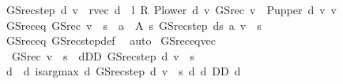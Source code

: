 \begin{isabellebody}
\endisatagproof
{\isafoldproof}%
%
\isadelimproof
\isanewline
%
\endisadelimproof
{}\isamarkupfalse%
\ {\isachardoublequoteopen}GS{\isacharunderscore}{\kern0pt}rec{\isacharunderscore}{\kern0pt}step\ d\ v\ {\isasymequiv}\ r{\isacharunderscore}{\kern0pt}vec\ d\ {\isacharplus}{\kern0pt}\ l\ {\isacharasterisk}{\kern0pt}\isactrlsub R\ {\isacharparenleft}{\kern0pt}P{\isacharunderscore}{\kern0pt}lower\ d\ {\isacharasterisk}{\kern0pt}v\ GS{\isacharunderscore}{\kern0pt}rec\ v\ {\isacharplus}{\kern0pt}\ P{\isacharunderscore}{\kern0pt}upper\ d\ {\isacharasterisk}{\kern0pt}v\ v{\isacharparenright}{\kern0pt}{\isachardoublequoteclose}\isanewline
\isanewline
{}\isamarkupfalse%
\ GS{\isacharunderscore}{\kern0pt}rec{\isacharunderscore}{\kern0pt}eq{\isacharprime}{\kern0pt}{\isacharcolon}{\kern0pt}\ {\isachardoublequoteopen}GS{\isacharunderscore}{\kern0pt}rec\ v\ {\isachardollar}{\kern0pt}\ s\ {\isacharequal}{\kern0pt}\ {\isacharparenleft}{\kern0pt}{\isasymSqunion}a\ {\isasymin}\ A\ s{\isachardot}{\kern0pt}\ GS{\isacharunderscore}{\kern0pt}rec{\isacharunderscore}{\kern0pt}step\ {\isacharparenleft}{\kern0pt}d{\isacharparenleft}{\kern0pt}s{\isacharcolon}{\kern0pt}{\isacharequal}{\kern0pt}\ a{\isacharparenright}{\kern0pt}{\isacharparenright}{\kern0pt}\ v\ {\isachardollar}{\kern0pt}\ s{\isacharparenright}{\kern0pt}{\isachardoublequoteclose}\isanewline
%
\isadelimproof
\ \ %
\endisadelimproof
%
\isatagproof
{}\isamarkupfalse%
\ GS{\isacharunderscore}{\kern0pt}rec{\isacharunderscore}{\kern0pt}eq\ GS{\isacharunderscore}{\kern0pt}rec{\isacharunderscore}{\kern0pt}step{\isacharunderscore}{\kern0pt}def\ \isamarkupfalse%
\ auto%
\endisatagproof
{\isafoldproof}%
%
\isadelimproof
\isanewline
%
\endisadelimproof
\isanewline
{}\isamarkupfalse%
\ GS{\isacharunderscore}{\kern0pt}rec{\isacharunderscore}{\kern0pt}eq{\isacharunderscore}{\kern0pt}vec{\isacharcolon}{\kern0pt}\isanewline
\ \ {\isachardoublequoteopen}GS{\isacharunderscore}{\kern0pt}rec\ v\ {\isachardollar}{\kern0pt}\ s\ {\isacharequal}{\kern0pt}\ {\isacharparenleft}{\kern0pt}{\isasymSqunion}d{\isasymin}D\isactrlsub D{\isachardot}{\kern0pt}\ GS{\isacharunderscore}{\kern0pt}rec{\isacharunderscore}{\kern0pt}step\ d\ v\ {\isachardollar}{\kern0pt}\ s{\isacharparenright}{\kern0pt}{\isachardoublequoteclose}\isanewline
%
\isadelimproof
%
\endisadelimproof
%
\isatagproof
{}\isamarkupfalse%
\ {\isacharminus}{\kern0pt}\isanewline
\ \ \isamarkupfalse%
\ d\ \ d{\isacharcolon}{\kern0pt}\ {\isachardoublequoteopen}is{\isacharunderscore}{\kern0pt}arg{\isacharunderscore}{\kern0pt}max\ {\isacharparenleft}{\kern0pt}{\isasymlambda}d{\isachardot}{\kern0pt}\ GS{\isacharunderscore}{\kern0pt}rec{\isacharunderscore}{\kern0pt}step\ d\ v\ {\isachardollar}{\kern0pt}\ s{\isacharparenright}{\kern0pt}\ {\isacharparenleft}{\kern0pt}{\isasymlambda}d{\isachardot}{\kern0pt}\ d\ {\isasymin}D\isactrlsub D{\isacharparenright}{\kern0pt}\ d{\isachardoublequoteclose}\isanewline

\end{isabellebody}
